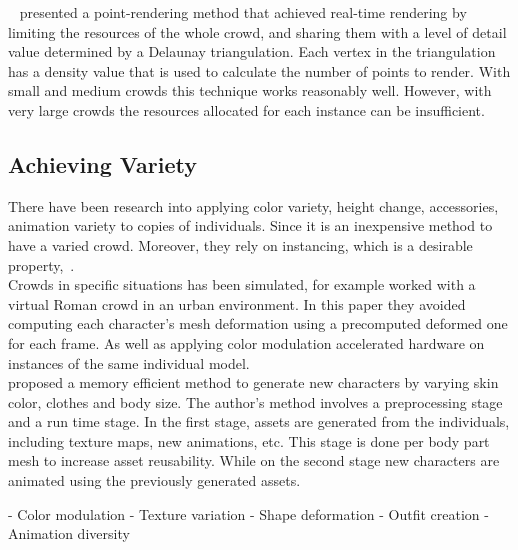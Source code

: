 \documentclass[6pt]{article} %
\begin{document}
\begin{multicols}{2}
~\cite{Larkin2010} presented a point-rendering method that achieved real-time rendering by limiting the resources of the whole crowd, and sharing them with a level of detail value determined by a Delaunay triangulation. 
Each vertex in the triangulation has a density value that is used to calculate the number of points to render.
With small and medium crowds this technique works reasonably well.
However, with very large crowds the resources allocated for each instance can be insufficient.

\subsection{Achieving Variety}

There have been research into applying color variety, height change, accessories, animation variety to copies of individuals.
Since it is an inexpensive method to have a varied crowd.
Moreover, they rely on instancing, which is a desirable property,~\cite{zelsnack2004glsl}.\\

Crowds in specific situations has been simulated, for example \cite{deHeras2005} worked with a virtual Roman crowd in an urban environment.
In this paper they avoided computing each character’s mesh deformation using a precomputed deformed one for each frame. As well as applying color modulation accelerated hardware on instances of the same individual model.\\

\cite{ruiz2013} proposed a memory efficient method to generate new characters by varying skin color, clothes and body size.
The author's method involves a preprocessing stage and a run time stage.
In the first stage, assets are generated from the individuals, including texture maps, new animations, etc.
This stage is done per body part mesh to increase asset reusability.
While on the second stage new characters are animated using the previously generated assets.

- Color modulation
- Texture variation
- Shape deformation
- Outfit creation
- Animation diversity


\end{multicols}
\end{document}
